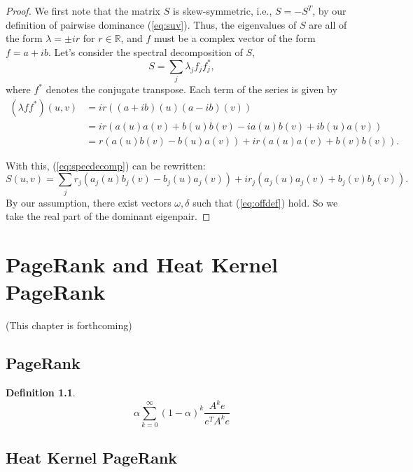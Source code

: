 \documentclass[a4,11pt,twoside,leqno]{report}
\theoremstyle{definition}
\newtheorem{defn}[thm]{Definition}
\theoremstyle{remark}
\numberwithin{equation}{section}
\newcommand{\R}{\mathbb{R}}
\begin{document}
\begin{proof}
We first note that the matrix $S$ is skew-symmetric, i.e., $S = -S^T$, by our
definition of pairwise dominance (\ref{eq:suv}).  Thus, the eigenvalues of $S$
are all of the form $\lambda = \pm ir$ for $r\in\R$, and $f$ must be a complex
vector of the form $f = a + ib$.  Let's consider the spectral decomposition of
$S$,
\begin{equation}\label{eq:specdecomp}
S = \sum_j \lambda_j f_jf_j^*,
\end{equation}
where $f^*$ denotes the conjugate transpose.  Each term of the series is given
by
\begin{align*}
(\lambda f f^*)(u,v) &= ir((a+ib)(u)(a-ib)(v))\\
&= ir(a(u)a(v) + b(u)b(v) - ia(u)b(v) + ib(u)a(v))\\
&= r(a(u)b(v) - b(u)a(v)) + ir(a(u)a(v) + b(v)b(v)).
\end{align*}

With this, (\ref{eq:specdecomp}) can be rewritten:
\begin{equation*}
S(u,v) = \sum_j r_j(a_j(u)b_j(v) - b_j(u)a_j(v)) + ir_j(a_j(u)a_j(v) +
b_j(v)b_j(v)).
\end{equation*}
By our assumption, there exist vectors $\omega, \delta$ such that
(\ref{eq:offdef}) hold.  So we take the real part of the dominant eigenpair.


\end{proof}

\chapter{PageRank and Heat Kernel PageRank}

(This chapter is forthcoming)

\section{PageRank}

\begin{defn}

$$\alpha \displaystyle \sum_{k=0}^{\infty} (1-\alpha)^k \frac{A^ke}{e^TA^ke}$$

\end{defn}

\section{Heat Kernel PageRank}
\end{document}
